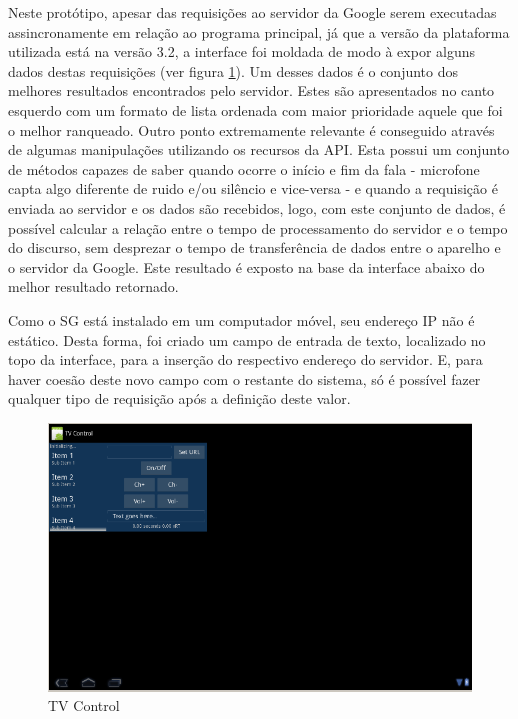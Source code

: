 \documentclass[12pt,a4paper,oneside]{report}
\begin{document}
Neste protótipo, apesar das requisições ao servidor da Google serem executadas assincronamente em relação ao programa principal, já que a versão da plataforma utilizada está na versão 3.2, a interface foi moldada de modo à expor alguns dados destas requisições (ver figura \ref{fig:tv-control}). Um desses dados é o conjunto dos melhores resultados encontrados pelo servidor. Estes são apresentados no canto esquerdo com um formato de lista ordenada com maior prioridade aquele que foi o melhor ranqueado. Outro ponto extremamente relevante é conseguido através de algumas manipulações utilizando os recursos da API. Esta possui um conjunto de métodos capazes de saber quando ocorre o início e fim da fala - microfone capta algo diferente de ruido e/ou silêncio e vice-versa - e quando a requisição é enviada ao servidor e os dados são recebidos, logo, com este conjunto de dados, é possível calcular a relação entre o tempo de processamento do servidor e o tempo do discurso, sem desprezar o tempo de transferência de dados entre o aparelho e o servidor da Google. Este resultado é exposto na base da interface abaixo do melhor resultado retornado.

Como o SG está instalado em um computador móvel, seu endereço IP não é estático. Desta forma, foi criado um campo de entrada de texto, localizado no topo da interface, para a inserção do respectivo endereço do servidor. E, para haver coesão deste novo campo com o restante do sistema, só é possível fazer qualquer tipo de requisição após a definição deste valor.

\begin{figure}[htbp]
   \centering
    \includegraphics[width=1\textwidth]{figuras/tv_control}
    \caption{TV Control}
    \label{fig:tv-control}
\end{figure}
\end{document}
